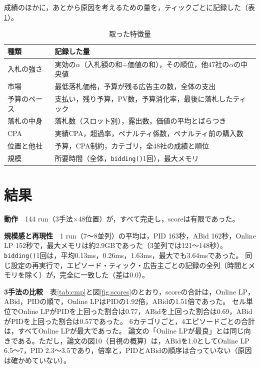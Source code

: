 \documentclass[twocolumn, 10pt]{ujarticle}
\begin{document}
成績のほかに，あとから原因を考えるための量を，ティックごとに記録した（表\ref{tab:feat}）。

\begin{table}[H]
\centering
\caption{取った特徴量}
\label{tab:feat}
\footnotesize
\begin{tabularx}{\linewidth}{@{}l>{\raggedright\arraybackslash}X@{}}
\toprule
種類 & 記録した量 \\
\midrule
入札の強さ & 実効の$\alpha$（入札額の和$\div$価値の和），その順位，他47社の$\alpha$の中央値 \\
市場 & 最低落札価格，予算が残る広告主の数，全体の支出 \\
予算のペース & 支払い，残り予算，PV数，予算消化率，最後に落札したティック \\
落札の中身 & 落札数（スロット別），露出数，価値の平均とばらつき \\
CPA & 実績CPA，超過率，ペナルティ係数，ペナルティ前の購入数 \\
位置と他社 & 予算，CPA制約，カテゴリ，全48社の成績と順位 \\
規模 & 所要時間（全体，\texttt{bidding()}1回），最大メモリ \\
\bottomrule
\end{tabularx}
\end{table}

\section{結果}\label{sec:e-result}

\textbf{動作}　144 run（3手法$\times$48位置）が，すべて完走し，scoreは有限であった。

\textbf{規模感と再現性}　1 run（7〜8並列）の平均は，PID 163秒，ABid 162秒，Online LP 152秒で，最大メモリは約2.9GBであった（3並列では121〜148秒）。
\texttt{bidding()}1回は，平均0.13ms，0.26ms，1.63ms，最大でも3.64msであった。
同じ設定の再実行で，エピソード・ティック・広告主ごとの記録の全列（時間とメモリを除く）が，完全に一致した（差は0.0）。

\textbf{3手法の比較}　表\ref{tab:cmp}と図\ref{fig:scores}のとおり，scoreの合計は，Online LP，ABid，PIDの順で，Online LPはPIDの1.92倍，ABidの1.51倍であった。
セル単位でOnline LPがPIDを上回った割合は0.77，ABidを上回った割合は0.69，ABidがPIDを上回った割合は0.57であった。
6カテゴリごと，4エピソードごとの合計は，すべてOnline LPが最大であった。
論文の「Online LPが最良」とは同じ向きである。ただし，論文の図10（目視の概算）は，ABidを1.0としてOnline LP 6.5〜7，PID 2.3〜3.5であり，倍率と，PIDとABidの順序は合っていない（原因は確かめていない）。
\end{document}
